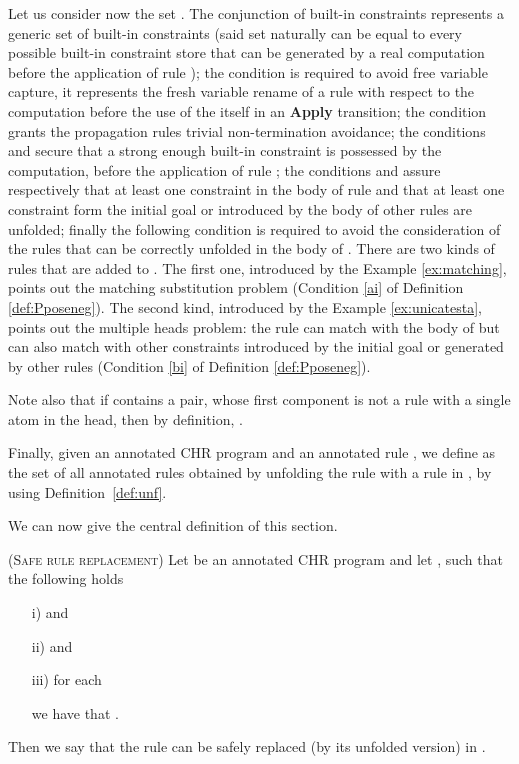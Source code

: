 \documentclass[final]{acmtrans2e}
\begin{document}
Let us consider now the set .
The conjunction of built-in constraints 
represents a generic set of built-in constraints
(said set naturally can be equal to every possible built-in constraint store that can
be generated by a real computation before the application of rule ); the
condition  is required to avoid free variable capture,
it represents the fresh variable rename of a rule  with respect to the computation
before the use of the  itself in an \textbf{Apply} transition;
the condition  grants the propagation rules
trivial non-termination avoidance;
the conditions  and
 secure that a strong enough built-in constraint
is possessed by the computation, before the application of rule ;
the conditions  and  assure respectively that
at least one constraint in the body of rule  and that at least
one constraint form the initial goal or introduced by the body of other rules are unfolded;
finally the following condition
 is required
to avoid the consideration of the rules that can be correctly unfolded in the body of .
There are two kinds of rules that are added to .
The first one, introduced by the Example \ref{ex:matching}, points out the
matching substitution problem (Condition \ref{ai} of Definition \ref{def:Pposeneg}).
The second kind, introduced by the Example \ref{ex:unicatesta}, points out the multiple
heads problem: the rule  can match with the body of  but can also match with
other constraints introduced by the initial goal or generated by other rules
(Condition \ref{bi} of Definition \ref{def:Pposeneg}).

Note also that if  contains a pair, whose first component is not
a rule with a single atom in the head, then by definition,
.


Finally, given an annotated CHR program  and an annotated rule
, we
define  as the set of all annotated rules obtained by unfolding
the rule  with a rule in , by using Definition~\ref{def:unf}.

We can now give the central definition of this section.

\begin{definition}\textsc{(Safe rule replacement)}\label{def:nsafedel}
Let  be an annotated CHR program and let , such that the following
holds
\begin{enumerate}
\item[i)]    and

\item[ii)]   and
\item[iii)] for each

we have that .
\end{enumerate}
Then we say that the rule 
can be safely replaced (by its unfolded version) in .
\end{definition}
\end{document}
